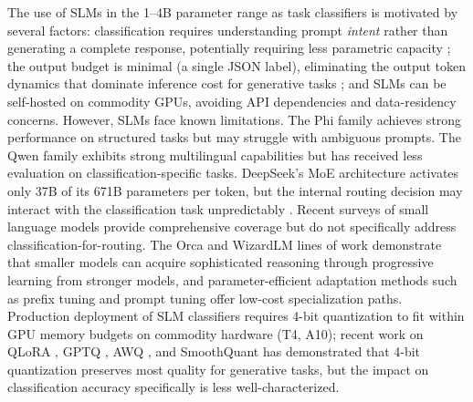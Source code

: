\documentclass{article}
\begin{document}
The use of SLMs in the 1--4B parameter range as task classifiers is motivated by several factors: classification requires understanding prompt \emph{intent} rather than generating a complete response, potentially requiring less parametric capacity \citep{kaplan2020scaling}; the output budget is minimal (a single JSON label), eliminating the output token dynamics that dominate inference cost for generative tasks \citep{willard2023outlines,zheng2024outlines}; and SLMs can be self-hosted on commodity GPUs, avoiding API dependencies and data-residency concerns. However, SLMs face known limitations. The Phi family \citep{abdin2024phi3,abdin2024phi4} achieves strong performance on structured tasks but may struggle with ambiguous prompts. The Qwen family \citep{yang2024qwen2,yang2024qwen25} exhibits strong multilingual capabilities but has received less evaluation on classification-specific tasks. DeepSeek's MoE architecture \citep{liu2024deepseek,dai2024deepseek} activates only 37B of its 671B parameters per token, but the internal routing decision may interact with the classification task unpredictably \citep{shazeer2017moe,fedus2022switch,lepikhin2021gshard}. Recent surveys of small language models \citep{lu2024slmsurvey,wang2024slmsurvey} provide comprehensive coverage but do not specifically address classification-for-routing. The Orca \citep{mukherjee2023orca,mitra2023orca2} and WizardLM \citep{xu2023wizardlm} lines of work demonstrate that smaller models can acquire sophisticated reasoning through progressive learning from stronger models, and parameter-efficient adaptation methods such as prefix tuning \citep{li2021prefix} and prompt tuning \citep{lester2021prompt} offer low-cost specialization paths. Production deployment of SLM classifiers requires 4-bit quantization to fit within GPU memory budgets on commodity hardware (T4, A10); recent work on QLoRA \citep{dettmers2023qlora}, GPTQ \citep{frantar2023gptq}, AWQ \citep{lin2024awq}, and SmoothQuant \citep{xiao2023smoothquant} has demonstrated that 4-bit quantization preserves most quality for generative tasks, but the impact on classification accuracy specifically is less well-characterized.
\end{document}
